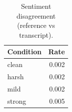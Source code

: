 \begin{table}[t]
\centering
\caption{Sentiment disagreement (reference vs transcript).}
\label{tab:disagreement}
\begin{tabular}{lr}
\toprule
Condition & Rate \\
\midrule
clean & 0.002 \\
harsh & 0.002 \\
mild & 0.002 \\
strong & 0.005 \\
\bottomrule
\end{tabular}
\end{table}
